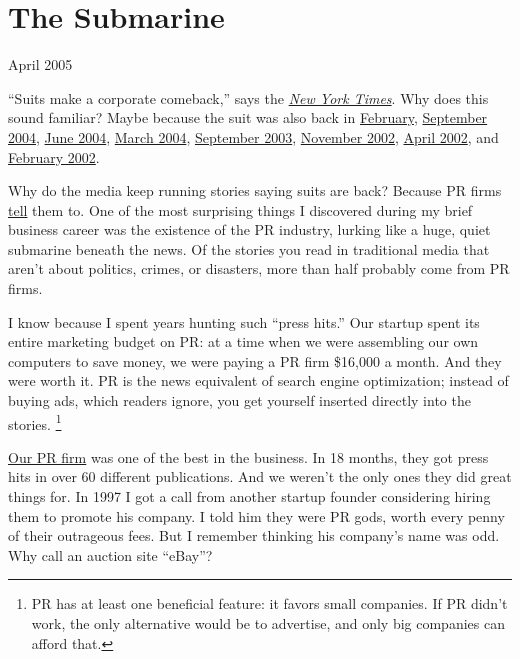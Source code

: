 \chapter{The Submarine}

April 2005

``Suits make a corporate comeback,'' says the
\href{http://www.nytimes.com/2005/04/14/fashion/thursdaystyles/14peacock.html?ex=1271131200&en=e96f2670387e3636&ei=5090&partner=rssuserland}{\emph{New
York Times}}. Why does this sound familiar? Maybe because the suit was
also back in
\href{http://www.cvbizlink.com/articles/2005/04/07/news/news/doc42406f05edf53293947237.prt}{February},
\href{http://www.usatoday.com/money/industries/retail/2004-09-01-suits_x.htm}{September
2004},
\href{http://www.cnn.com/2004/BUSINESS/06/23/go.fashion.jones/}{June
2004}, \href{http://www.post-gazette.com/pg/04062/279616.stm}{March
2004},
\href{http://www.southcoasttoday.com/daily/09-03/09-21-03/c01li238.htm}{September
2003},
\href{http://www.businessweek.com/magazine/content/02_46/b3808122.htm}{November
2002}, \href{http://www.pittsburghlive.com/x/s_65540.html}{April 2002},
and \href{http://news.bbc.co.uk/1/hi/business/1836010.stm}{February
2002}.

Why do the media keep running stories saying suits are back? Because PR
firms \href{http://www.maximumexposurepr.com/middleMAA.html}{tell} them
to. One of the most surprising things I discovered during my brief
business career was the existence of the PR industry, lurking like a
huge, quiet submarine beneath the news. Of the stories you read in
traditional media that aren't about politics, crimes, or disasters, more
than half probably come from PR firms.

I know because I spent years hunting such ``press hits.'' Our startup
spent its entire marketing budget on PR: at a time when we were
assembling our own computers to save money, we were paying a PR firm
\$16,000 a month. And they were worth it. PR is the news equivalent of
search engine optimization; instead of buying ads, which readers ignore,
you get yourself inserted directly into the stories.
\footnote{PR has at least one beneficial feature: it favors small
companies. If PR didn't work, the only alternative would be to
advertise, and only big companies can afford that.}

\href{http://schwartz-pr.com/client_coverage.php}{Our PR firm} was one
of the best in the business. In 18 months, they got press hits in over
60 different publications. And we weren't the only ones they did great
things for. In 1997 I got a call from another startup founder
considering hiring them to promote his company. I told him they were PR
gods, worth every penny of their outrageous fees. But I remember
thinking his company's name was odd. Why call an auction site ``eBay''?

